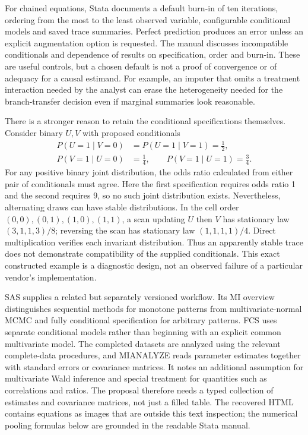 For chained equations, Stata documents a default burn-in of ten iterations,
ordering from the most to the least observed variable, configurable conditional
models and saved trace summaries. Perfect prediction produces an error unless
an explicit augmentation option is requested. The manual discusses
incompatible conditionals and dependence of results on specification, order
and burn-in. These are useful controls, but a chosen default is not a proof of
convergence or of adequacy for a causal estimand. For example, an imputer that
omits a treatment interaction needed by the analyst can erase the heterogeneity
needed for the branch-transfer decision even if marginal summaries look
reasonable. \cite{exec21_transport_stata_chained,exec21_transport_stata_substantive}

There is a stronger reason to retain the conditional specifications themselves.
Consider binary $U,V$ with proposed conditionals
\begin{equation}
 \begin{aligned}
 P(U=1\mid V=0)&=P(U=1\mid V=1)=\tfrac12,\\
 P(V=1\mid U=0)&=\tfrac14,\qquad P(V=1\mid U=1)=\tfrac34.
 \end{aligned}
 \label{exec21:transport-conditionals}
\end{equation}
For any positive binary joint distribution, the odds ratio calculated from
either pair of conditionals must agree. Here the first specification requires
odds ratio 1 and the second requires 9, so no such joint distribution exists.
Nevertheless, alternating draws can have stable distributions. In the cell
order $(0,0),(0,1),(1,0),(1,1)$, a scan updating $U$ then $V$ has stationary
law $(3,1,1,3)/8$; reversing the scan has stationary law $(1,1,1,1)/4$.
Direct multiplication verifies each invariant distribution. Thus an apparently
stable trace does not demonstrate compatibility of the supplied conditionals.
This exact constructed example is a diagnostic design, not an observed failure
of a particular vendor's implementation. \cite{exec21_transport_reference}

SAS supplies a related but separately versioned workflow. Its MI overview
distinguishes sequential methods for monotone patterns from multivariate-normal
MCMC and fully conditional specification for arbitrary patterns. FCS uses
separate conditional models rather than beginning with an explicit common
multivariate model. The completed datasets are analyzed using the relevant
complete-data procedures, and MIANALYZE reads parameter estimates together with
standard errors or covariance matrices. It notes an additional assumption for
multivariate Wald inference and special treatment for quantities such as
correlations and ratios. The proposal therefore needs a typed collection of
estimates and covariance matrices, not just a filled table. The recovered HTML
contains equations as images that are outside this text inspection; the numerical
pooling formulas below are grounded in the readable Stata manual.
\cite{exec21_transport_sas_mi_intro,exec21_transport_sas_mianalyze_intro,exec21_transport_sas_combining}

